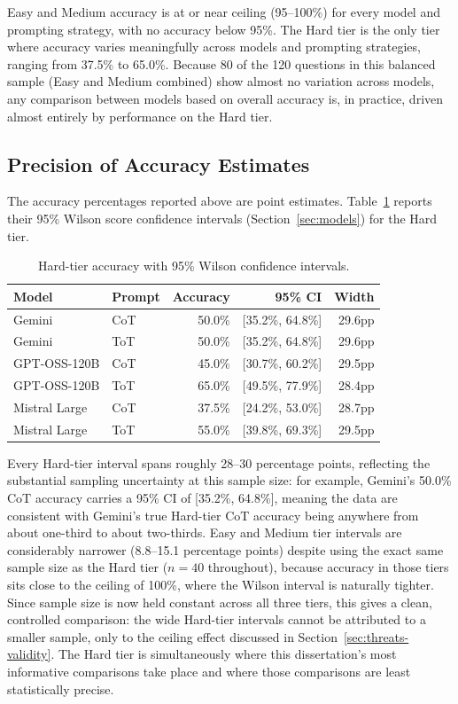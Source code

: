 Easy and Medium accuracy is at or near ceiling (95--100\%) for every
model and prompting strategy, with no accuracy below 95\%. The Hard tier
is the only tier where accuracy varies meaningfully across models and
prompting strategies, ranging from 37.5\% to 65.0\%. Because 80 of the
120 questions in this balanced sample (Easy and Medium combined) show
almost no variation across models, any comparison between models based
on overall accuracy is, in practice, driven almost entirely by
performance on the Hard tier.

\subsection*{Precision of Accuracy Estimates}

The accuracy percentages reported above are point estimates.
Table~\ref{tab:ci-hard} reports their 95\% Wilson score confidence
intervals (Section~\ref{sec:models}) for the Hard tier.

\begin{table}[H]
  \centering
  \caption{Hard-tier accuracy with 95\% Wilson confidence intervals.}
  \label{tab:ci-hard}
  \begin{tabular}{llrrr}
    \toprule
    Model & Prompt & Accuracy & 95\% CI & Width \\
    \midrule
    Gemini & CoT & 50.0\% & [35.2\%, 64.8\%] & 29.6pp \\
    Gemini & ToT & 50.0\% & [35.2\%, 64.8\%] & 29.6pp \\
    GPT-OSS-120B & CoT & 45.0\% & [30.7\%, 60.2\%] & 29.5pp \\
    GPT-OSS-120B & ToT & 65.0\% & [49.5\%, 77.9\%] & 28.4pp \\
    Mistral Large & CoT & 37.5\% & [24.2\%, 53.0\%] & 28.7pp \\
    Mistral Large & ToT & 55.0\% & [39.8\%, 69.3\%] & 29.5pp \\
    \bottomrule
  \end{tabular}
\end{table}

Every Hard-tier interval spans roughly 28--30 percentage points,
reflecting the substantial sampling uncertainty at this sample size: for
example, Gemini's 50.0\% CoT accuracy carries a 95\% CI of [35.2\%,
64.8\%], meaning the data are consistent with Gemini's true Hard-tier
CoT accuracy being anywhere from about one-third to about two-thirds.
Easy and Medium tier intervals are considerably narrower (8.8--15.1
percentage points) despite using the exact same sample size as the Hard
tier ($n=40$ throughout), because accuracy in those tiers sits close to
the ceiling of 100\%, where the Wilson interval is naturally tighter.
Since sample size is now held constant across all three tiers, this
gives a clean, controlled comparison: the wide Hard-tier intervals
cannot be attributed to a smaller sample, only to the ceiling effect
discussed in Section~\ref{sec:threats-validity}. The Hard tier is
simultaneously where this dissertation's most informative comparisons
take place and where those comparisons are least statistically precise.

